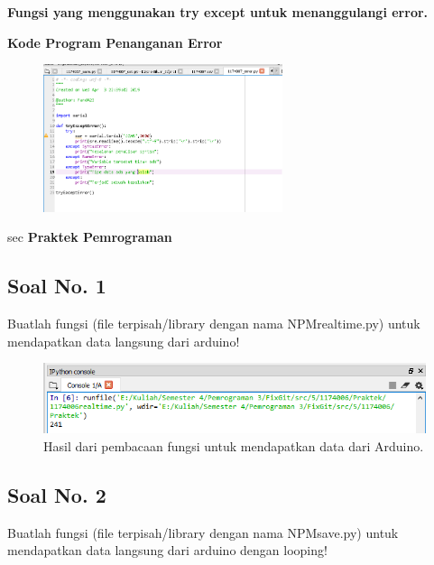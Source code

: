 \textbf{Fungsi yang menggunakan try except untuk menanggulangi error.}



\textbf{Kode Program Penanganan Error}
\begin{figure}[ht]
	\includegraphics[width=7cm]{figures/5/1174087/Praktek/1174087_error.png}
	\centering
\end{figure}
sec
{\Large \textbf{Praktek Pemrograman}}
\subsection{Soal No. 1}
Buatlah  fungsi  (file  terpisah/library  dengan  nama  NPMrealtime.py)  untuk mendapatkan data langsung dari arduino!


\begin{figure}[H]
	\includegraphics[width=12cm]{figures/5/1174089/Praktek/1.png}
	\centering
	\caption{Hasil dari pembacaan fungsi untuk mendapatkan data dari Arduino.}
\end{figure}

\subsection{Soal No. 2}
Buatlah fungsi (file terpisah/library dengan nama NPMsave.py) untuk mendapatkan data langsung dari arduino dengan looping!


